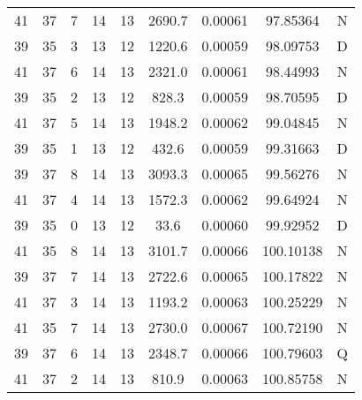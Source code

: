 \begin{table*}[htp]
\begin{tabular}{ccccccccc}
41 & 37 & 7 & 14 & 13 & 2690.7 & 0.00061 & 97.85364 & N \\
39 & 35 & 3 & 13 & 12 & 1220.6 & 0.00059 & 98.09753 & D \\
41 & 37 & 6 & 14 & 13 & 2321.0 & 0.00061 & 98.44993 & N \\
39 & 35 & 2 & 13 & 12 & 828.3 & 0.00059 & 98.70595 & D \\
41 & 37 & 5 & 14 & 13 & 1948.2 & 0.00062 & 99.04845 & N \\
39 & 35 & 1 & 13 & 12 & 432.6 & 0.00059 & 99.31663 & D \\
39 & 37 & 8 & 14 & 13 & 3093.3 & 0.00065 & 99.56276 & N \\
41 & 37 & 4 & 14 & 13 & 1572.3 & 0.00062 & 99.64924 & N \\
39 & 35 & 0 & 13 & 12 & 33.6 & 0.00060 & 99.92952 & D \\
41 & 35 & 8 & 14 & 13 & 3101.7 & 0.00066 & 100.10138 & N \\
39 & 37 & 7 & 14 & 13 & 2722.6 & 0.00065 & 100.17822 & N \\
41 & 37 & 3 & 14 & 13 & 1193.2 & 0.00063 & 100.25229 & N \\
41 & 35 & 7 & 14 & 13 & 2730.0 & 0.00067 & 100.72190 & N \\
39 & 37 & 6 & 14 & 13 & 2348.7 & 0.00066 & 100.79603 & Q \\
41 & 37 & 2 & 14 & 13 & 810.9 & 0.00063 & 100.85758 & N \\
\hline
\end{tabular}

\par 
\end{table*}
